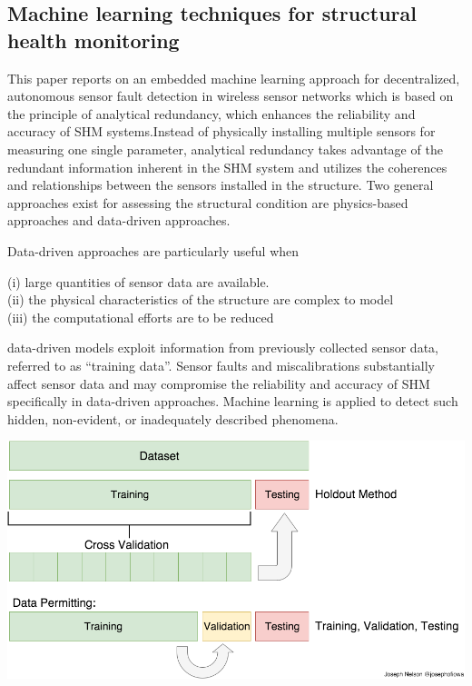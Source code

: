 \documentclass{article}
\begin{document}
\subsection{Machine learning techniques for structural health monitoring}
This paper reports on an embedded machine learning approach for decentralized, autonomous sensor fault detection in wireless sensor networks which is based on the principle of analytical redundancy, which enhances the reliability and accuracy of SHM systems.Instead of physically installing multiple sensors for measuring one single parameter, analytical redundancy takes advantage of the redundant information inherent in the SHM system and utilizes the coherences and relationships between the sensors installed in the structure.
Two general approaches exist for assessing the structural condition are physics-based approaches and data-driven approaches.

Data-driven approaches are particularly useful when 

\indent(i) large quantities of sensor data are available.
\\\indent(ii) the physical characteristics of the structure are complex to model
\\\indent(iii) the computational efforts are to be reduced

data-driven models exploit information from previously collected sensor data, referred to as “training data”. Sensor faults and miscalibrations substantially affect sensor data and may compromise the reliability and accuracy of SHM specifically in data-driven approaches. Machine learning is applied to detect such hidden, non-evident, or inadequately described phenomena.

\begin{center}
    \includegraphics[scale=0.3]{Images/TTV_split.png}
    
\end{center}
\end{document}

